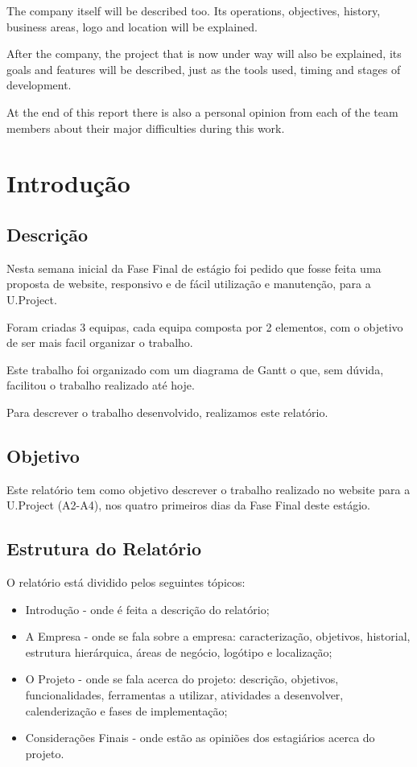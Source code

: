 \documentclass[11pt]{report}
\begin{document}
The company itself will be described too. Its operations, objectives, history, business areas, logo and location will be explained.


After the company, the project that is now under way will also be explained, its goals and features will be described, just as the tools used, timing and stages of development. 


At the end of this report there is also a personal opinion from each of the team members about their major difficulties during this work.
\tableofcontents

\newpage


\newpage

\chapter{Introdução}

\section{Descrição}
Nesta semana inicial da Fase Final de estágio foi pedido que fosse feita uma proposta de website, responsivo e de fácil utilização e manutenção, para a U.Project.

Foram criadas 3 equipas, cada equipa composta por 2 elementos, com o objetivo de ser mais facil organizar o trabalho.

Este trabalho foi organizado com um diagrama de Gantt o que, sem dúvida, facilitou o trabalho realizado até hoje.

Para descrever o trabalho desenvolvido, realizamos este relatório.

\section{Objetivo}
Este relatório tem como objetivo descrever o trabalho realizado no website para a U.Project (A2-A4), nos quatro primeiros dias da Fase Final deste estágio.

\section{Estrutura do Relatório}
O relatório está dividido pelos seguintes tópicos:
\begin{itemize}
    \item Introdução - onde é feita a descrição do relatório;
    \item A Empresa - onde se fala sobre a empresa: caracterização, objetivos, historial, estrutura hierárquica, áreas de negócio, logótipo e localização;
    \item O Projeto - onde se fala acerca do projeto: descrição, objetivos, funcionalidades, ferramentas a utilizar, atividades a desenvolver, calenderização e fases de implementação;
    \item Considerações Finais - onde estão as opiniões dos estagiários acerca do projeto.
\end{itemize}
\end{document}
